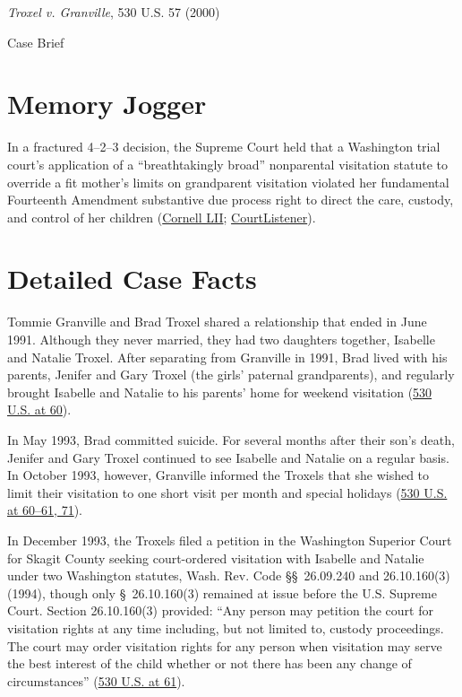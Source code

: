 \documentclass[12pt]{article}
\begin{document}
\begin{center}
{\LARGE \textit{Troxel v. Granville}, 530 U.S. 57 (2000)\par}
\vspace{0.8em}
{\large Case Brief\par}
\end{center}
\vspace{1em}

\section{Memory Jogger}
In a fractured 4--2--3 decision, the Supreme Court held that a Washington trial court's application of a ``breathtakingly broad'' nonparental visitation statute to override a fit mother's limits on grandparent visitation violated her fundamental Fourteenth Amendment substantive due process right to direct the care, custody, and control of her children (\href{https://www.law.cornell.edu/supremecourt/text/99-138}{Cornell LII}; \href{https://www.courtlistener.com/opinion/1087668/troxel-v-granville/}{CourtListener}).

\section{Detailed Case Facts}
Tommie Granville and Brad Troxel shared a relationship that ended in June 1991. Although they never married, they had two daughters together, Isabelle and Natalie Troxel. After separating from Granville in 1991, Brad lived with his parents, Jenifer and Gary Troxel (the girls' paternal grandparents), and regularly brought Isabelle and Natalie to his parents' home for weekend visitation (\href{https://www.law.cornell.edu/supremecourt/text/99-138}{530 U.S. at 60}).

In May 1993, Brad committed suicide. For several months after their son's death, Jenifer and Gary Troxel continued to see Isabelle and Natalie on a regular basis. In October 1993, however, Granville informed the Troxels that she wished to limit their visitation to one short visit per month and special holidays (\href{https://www.law.cornell.edu/supremecourt/text/99-138}{530 U.S. at 60--61, 71}).

In December 1993, the Troxels filed a petition in the Washington Superior Court for Skagit County seeking court-ordered visitation with Isabelle and Natalie under two Washington statutes, Wash. Rev. Code \S\S\ 26.09.240 and 26.10.160(3) (1994), though only \S\ 26.10.160(3) remained at issue before the U.S. Supreme Court. Section 26.10.160(3) provided: ``Any person may petition the court for visitation rights at any time including, but not limited to, custody proceedings. The court may order visitation rights for any person when visitation may serve the best interest of the child whether or not there has been any change of circumstances'' (\href{https://www.law.cornell.edu/supremecourt/text/99-138}{530 U.S. at 61}).
\end{document}
